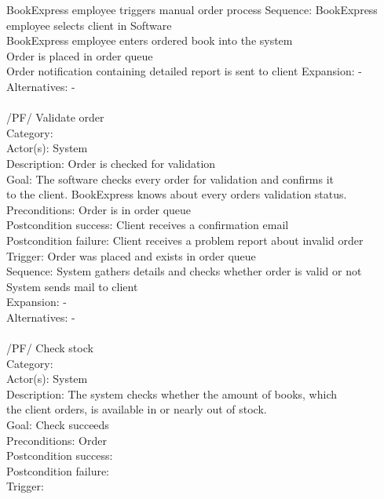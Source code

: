 \documentclass[11pt,a4paper,oneside,svgnames,draft]{report}
\begin{document}
\begin{tabbing}
	 \> BookExpress employee triggers manual order process
	 Sequence: \> BookExpress employee selects client in Software\\
	 \> BookExpress employee enters ordered book into the system\\
	 \> Order is placed in order queue\\
	 \> Order notification containing detailed report is sent to client
	 Expansion: \> -\\
	 Alternatives: \> -\\
	 \\
	 /PF/ \> Validate order\\ 
	 Category: \> \\
	 Actor(s): \> System\\ 
	 Description: \> Order is checked for validation\\ 
	 Goal: \> The software checks every order for validation and confirms it\\
	 \> to the client. BookExpress knows about every orders validation status.\\
	 Preconditions: \> Order is in order queue\\
	 Postcondition success: \> Client receives a confirmation email\\
	 Postcondition failure: \> Client receives a problem report about invalid order\\
	 Trigger: \> Order was placed and exists in order queue\\
	 Sequence: \> System  gathers details and checks whether order is valid or not\\
	 \> System sends mail to client\\
	 Expansion: \> -\\
	 Alternatives: \> -\\
	 \\
	 /PF/ \> Check stock\\ 
	 Category: \> \\
	 Actor(s): \> System\\ 
	 Description: \> The system checks whether the amount of books, which\\
	 \> the client orders, is available in or nearly out of stock.\\ 
	 Goal: \> Check succeeds\\
	 Preconditions: \> Order\\
	 Postcondition success: \> \\
	 Postcondition failure: \> \\
	 Trigger: \> \\

\end{tabbing}
\end{document}

